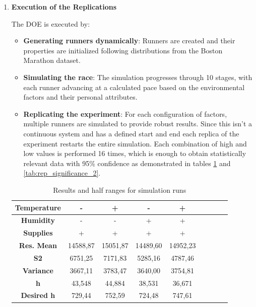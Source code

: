 \documentclass[conference]{IEEEtran}
\begin{document}
\begin{enumerate}
    \item \textbf{Execution of the Replications}
    
    The DOE is executed by:
    \begin{itemize}
        \item \textbf{Generating runners dynamically}: Runners are created and their properties are initialized following distributions from the Boston Marathon dataset.
        \item \textbf{Simulating the race}: The simulation progresses through 10 stages, with each runner advancing at a calculated pace based on the environmental factors and their personal attributes.
        \item \textbf{Replicating the experiment}: For each configuration of factors, multiple runners are simulated to provide robust results. Since this isn't a continuous system and has a defined start and end each replica of the experiment restarts the entire simulation. Each combination of high and low values is performed 16 times, which is enough to obtain statistically relevant data with 95\% confidence as demonstrated in tables \ref{tab:rep_significance} and \ref{tab:rep_significance_2}.
    \end{itemize}

    \begin{table}[]
    \caption{Results and half ranges for simulation runs}
    \begin{center}
    \begin{tabular}{|c|c|c|c|c|c|c|c|c|}
    \hline
    \textbf{Temperature} & - & + & - & + \\
    \hline
    \textbf{Humidity} & - & - & + & + \\
    \hline
    \textbf{Supplies} &+&+&+&+ \\
    \hline
    \textbf{Res. Mean} & 14588,87&15051,87&14489,60&14952,23 \\
    \hline
    \textbf{S2}& 6751,25&7171,83&5285,16&4787,46 \\
    \hline
    \textbf{Variance}&3667,11&3783,47&3640,00&3754,81\\
    \hline
    \textbf{h} &43,548&44,884&38,531&36,671\\
    \hline
    \textbf{Desired h}&729,44&752,59&724,48&747,61\\
    \hline
    \end{tabular}
    \label{tab:rep_significance}
    \end{center}
    \end{table}


\end{enumerate}
\end{document}
